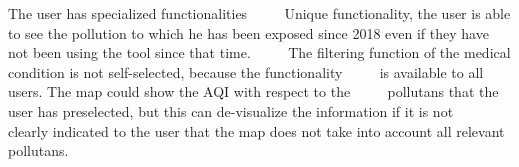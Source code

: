      


\begin{itemize}
  \done The user has specialized functionalities
     \done Unique functionality, the user is able to see the pollution to which he has been exposed since 2018 even if they have not been using the tool since that time.
     \crossed The filtering function of the medical condition is not self-selected, because the functionality
     is available to all users. The map could show the AQI with respect to the
     pollutans that the user has preselected, but this can de-visualize the information if it is not
     clearly indicated to the user that the map does not take into account all relevant pollutans.
\end{itemize}
